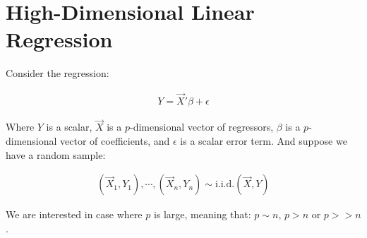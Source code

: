 \section{High-Dimensional Linear Regression}

Consider the regression: 

\begin{align*}
    Y = \Vec{X}'\beta + \epsilon
\end{align*}

Where $Y$ is a scalar, $\Vec{X}$ is a $p$-dimensional vector of regressors, $\beta$ is a $p$-dimensional vector of coefficients, and $\epsilon$ is a scalar error term. And suppose we have a random sample:

\begin{align*}
    (\Vec{X}_1, Y_1), \cdots, (\Vec{X}_n, Y_n) \sim \text{i.i.d.} (\Vec{X}, Y)
\end{align*}

We are interested in case where $p$ is large, meaning that: $p \sim n$, $p > n$ or $p >> n$.

